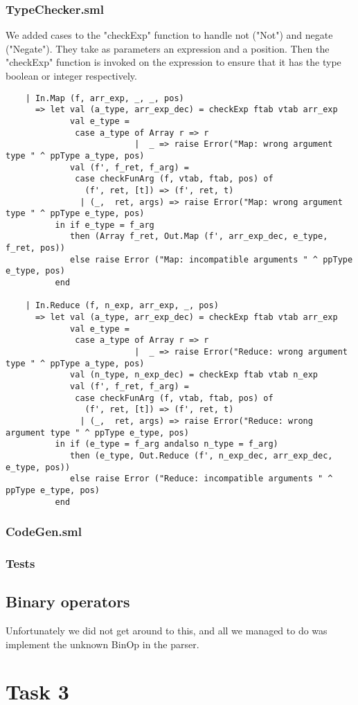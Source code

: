 \documentclass[12pt]{article}
\begin{document}
\subsubsection{TypeChecker.sml}
We added cases to the "checkExp" function to handle not ("Not") and negate ("Negate"). They take as parameters an expression and a position. Then the "checkExp" function is invoked on the expression to ensure that it has the type boolean or integer respectively.
\begin{verbatim}
    | In.Map (f, arr_exp, _, _, pos)
      => let val (a_type, arr_exp_dec) = checkExp ftab vtab arr_exp
             val e_type = 
              case a_type of Array r => r
                          |  _ => raise Error("Map: wrong argument type " ^ ppType a_type, pos)
             val (f', f_ret, f_arg) = 
              case checkFunArg (f, vtab, ftab, pos) of
                (f', ret, [t]) => (f', ret, t)
               | (_,  ret, args) => raise Error("Map: wrong argument type " ^ ppType e_type, pos)
          in if e_type = f_arg 
             then (Array f_ret, Out.Map (f', arr_exp_dec, e_type, f_ret, pos))
             else raise Error ("Map: incompatible arguments " ^ ppType e_type, pos)
          end
          
    | In.Reduce (f, n_exp, arr_exp, _, pos)
      => let val (a_type, arr_exp_dec) = checkExp ftab vtab arr_exp
             val e_type = 
              case a_type of Array r => r
                          |  _ => raise Error("Reduce: wrong argument type " ^ ppType a_type, pos)
             val (n_type, n_exp_dec) = checkExp ftab vtab n_exp
             val (f', f_ret, f_arg) = 
              case checkFunArg (f, vtab, ftab, pos) of
                (f', ret, [t]) => (f', ret, t)
               | (_,  ret, args) => raise Error("Reduce: wrong argument type " ^ ppType e_type, pos)
          in if (e_type = f_arg andalso n_type = f_arg)
             then (e_type, Out.Reduce (f', n_exp_dec, arr_exp_dec, e_type, pos))
             else raise Error ("Reduce: incompatible arguments " ^ ppType e_type, pos)
          end
\end{verbatim}
\subsubsection{CodeGen.sml}


\subsubsection{Tests}
\subsection{Binary operators}
Unfortunately we did not get around to this, and all we managed to do was implement the unknown BinOp in the parser.
\section{Task 3}
\end{document}
